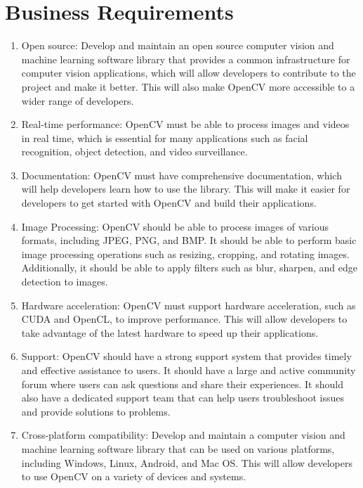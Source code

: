 \section{Business Requirements\label{Section::BusinessRequirements}}
\begin{enumerate}
    \item Open source: Develop and maintain an open source computer vision and machine learning software library that provides a common infrastructure for computer vision applications, which will allow developers to contribute to the project and make it better. This will also make OpenCV more accessible to a wider range of developers.
    \item Real-time performance: OpenCV must be able to process images and videos in real time, which is essential for many applications such as facial recognition, object detection, and video surveillance.
    \item Documentation: OpenCV must have comprehensive documentation, which will help developers learn how to use the library. This will make it easier for developers to get started with OpenCV and build their applications.
    \item Image Processing: OpenCV should be able to process images of various formats, including JPEG, PNG, and BMP. It should be able to perform basic image processing operations such as resizing, cropping, and rotating images. Additionally, it should be able to apply filters such as blur, sharpen, and edge detection to images.
    \item Hardware acceleration: OpenCV must support hardware acceleration, such as CUDA and OpenCL, to improve performance. This will allow developers to take advantage of the latest hardware to speed up their applications.    
    \item Support: OpenCV should have a strong support system that provides timely and effective assistance to users. It should have a large and active community forum where users can ask questions and share their experiences. It should also have a dedicated support team that can help users troubleshoot issues and provide solutions to problems.
    \item Cross-platform compatibility: Develop and maintain a computer vision and machine learning software library that can be used on various platforms, including Windows, Linux, Android, and Mac OS. This will allow developers to use OpenCV on a variety of devices and systems.     

\end{enumerate}

